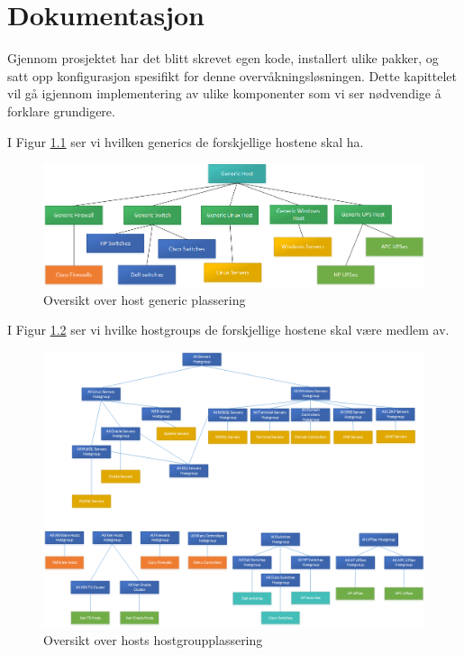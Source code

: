 \chapter{Dokumentasjon}
Gjennom prosjektet har det blitt skrevet egen kode, installert ulike pakker, og satt opp konfigurasjon spesifikt for denne overvåkningsløsningen. Dette kapittelet vil gå igjennom implementering av ulike komponenter som vi ser nødvendige å forklare grundigere.

I Figur \ref{hostfigur} ser vi hvilken generics de forskjellige hostene skal ha.

\begin{figure}[H]
    \centering
    \includegraphics[scale=0.5]{img/host}
    \caption{Oversikt over host generic plassering}
    \label{hostfigur}
\end{figure}

I Figur \ref{hostgroupfigur} ser vi hvilke hostgroups de forskjellige hostene skal være medlem av.

\begin{figure}[H]
    \centering
    \includegraphics[scale=0.5]{img/hostgroups}
    \caption{Oversikt over hosts hostgroupplassering}
    \label{hostgroupfigur}
\end{figure}

